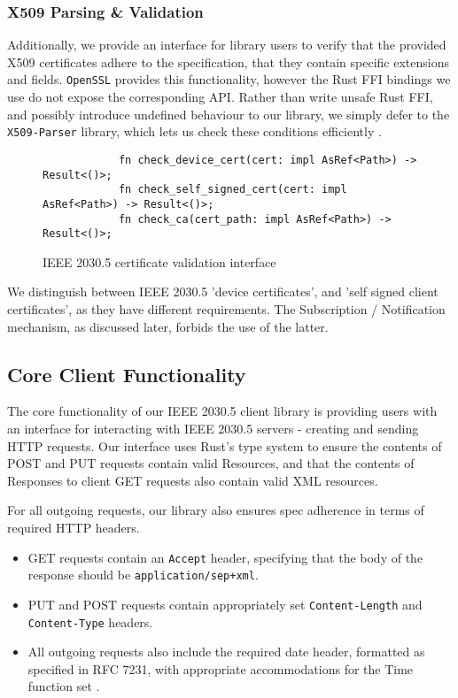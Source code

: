 \subsubsection{X509 Parsing \& Validation}
Additionally, we provide an interface for library users to verify that the provided X509 certificates adhere to the specification, that they contain specific extensions and fields. \texttt{OpenSSL} provides this functionality, however the Rust FFI bindings we use do not expose the corresponding API. Rather than write unsafe Rust FFI, and possibly introduce undefined behaviour to our library, we simply defer to the \texttt{X509-Parser} library, which lets us check these conditions efficiently \cite{x509parser}.

\begin{figure}[h]
    \begin{center}
        \begin{lstlisting}
            fn check_device_cert(cert: impl AsRef<Path>) -> Result<()>;
            fn check_self_signed_cert(cert: impl AsRef<Path>) -> Result<()>;
            fn check_ca(cert_path: impl AsRef<Path>) -> Result<()>;
        \end{lstlisting}
        \label{fig:certvalidinterface}
        \vspace{-10pt}
        \caption{IEEE 2030.5 certificate validation interface}
    \end{center}
\end{figure}

We distinguish between IEEE 2030.5 'device certificates', and 'self signed client certificates', as they have different requirements. The Subscription / Notification mechanism, as discussed later, forbids the use of the latter.

\subsection{Core Client Functionality}
The core functionality of our IEEE 2030.5 client library is providing users with an interface for interacting with IEEE 2030.5 servers - creating and sending HTTP requests.
Our interface uses Rust's type system to ensure the contents of POST and PUT requests contain valid Resources, and that the contents of Responses to client GET requests also contain valid XML resources.

For all outgoing requests, our library also ensures spec adherence in terms of required HTTP headers. 

\begin{itemize}
    \item GET requests contain an \texttt{Accept} header, specifying that the body of the response should be \texttt{application/sep+xml}.
    \item PUT and POST requests contain appropriately set \texttt{Content-Length} and \texttt{Content-Type} headers.
    \item All outgoing requests also include the required date header, formatted as specified in RFC 7231, with appropriate accommodations for the Time function set  \cite{rfc7231}.
\end{itemize}


